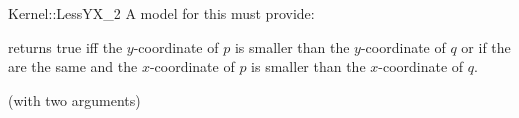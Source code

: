 \begin{ccRefFunctionObjectConcept}{Kernel::LessYX_2}
A model for this must provide:


{returns true iff the $y$-coordinate of $p$ is smaller than the
$y$-coordinate of $q$ or if the are the same and 
the $x$-coordinate of $p$ is smaller than the $x$-coordinate of $q$.}

\ccRefines
{} (with two arguments)

\ccSeeAlso
{}\\

\end{ccRefFunctionObjectConcept}
